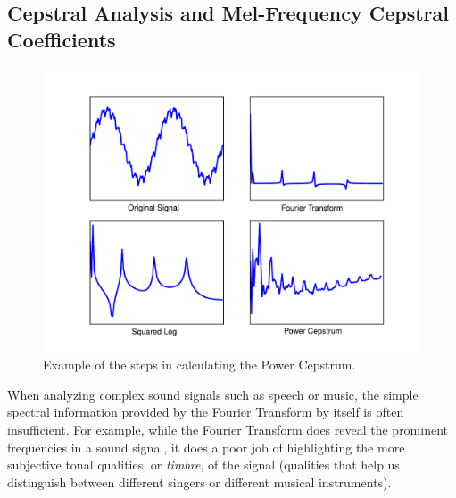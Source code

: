 \subsection*{Cepstral Analysis and Mel-Frequency Cepstral Coefficients}
\begin{figure}
\centering
\includegraphics[width=\textwidth]{PowerCepstrum.pdf}
\caption{Example of the steps in calculating the Power Cepstrum.}
\label{fourierext:pc}
\end{figure}
When analyzing complex sound signals such as speech or music, the simple spectral information provided by
the Fourier Transform by itself is often insufficient. For example, while the Fourier Transform does reveal
the prominent frequencies in a sound signal, it does a poor job of highlighting the more subjective
tonal qualities, or \emph{timbre}, of the signal (qualities that help us distinguish between different singers
or different musical instruments).

